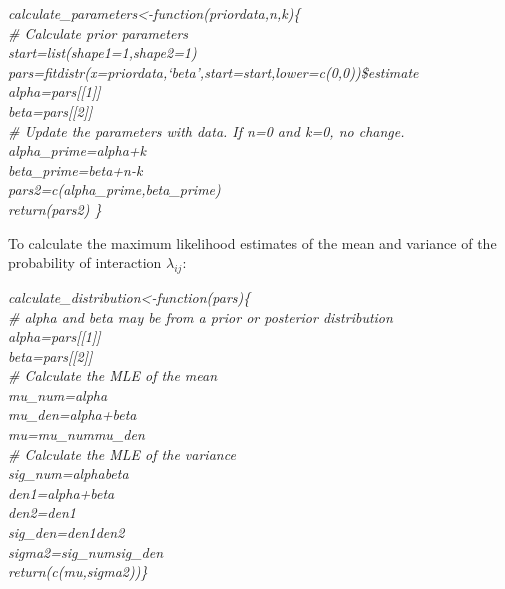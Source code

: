 \documentclass[12pt]{article}
\begin{document}
  \vspace{12pt}
  \emph{
  \noindent \hspace{-4pt}calculate\_parameters\textless-function(priordata,n,k)\{\\
  \hspace{4pt} \# Calculate prior parameters\\
  \hspace{4pt} start=list(shape1=1,shape2=1)
  \hspace{80pt} pars=fitdistr(x=priordata,`beta',start=start,lower=c(0,0))\$estimate\\
  \hspace{4pt} alpha=pars[[1]]\\
  \hspace{4pt} beta=pars[[2]]\\
  \hspace{4pt} \# Update the parameters with data. If n=0 and k=0, no change.\\
  \hspace{4pt} alpha\_prime=alpha+k\\
  \hspace{4pt} beta\_prime=beta+n-k\\
  \hspace{4pt} pars2=c(alpha\_prime,beta\_prime)\\
  \hspace{4pt} return(pars2) \}
  }
  \vspace{12pt}


    To calculate the maximum likelihood estimates of the mean and 
    variance of the probability of interaction $\lambda_{ij}$:

    \vspace{12pt}
    \emph{
    calculate\_distribution\textless-function(pars)\{\\
      \# alpha and beta may be from a prior or posterior distribution\\
      alpha=pars[[1]]\\
      beta=pars[[2]]\\


      \# Calculate the MLE of the mean\\
      mu\_num=alpha\\
      mu\_den=alpha+beta\\
      mu=mu\_num\/mu\_den\\


      \# Calculate the MLE of the variance\\
      sig\_num=alpha\*beta\\
      den1=alpha+beta\\
      den2=den1\*\\
      sig\_den=den1\*den2\\
      sigma2=sig\_num\/sig\_den\\


      return(c(mu,sigma2))\}
    }
  \vspace{12pt}
      
\end{document}
